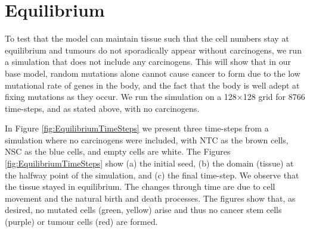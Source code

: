 \documentclass[\main/thesis.tex]{subfiles}
\begin{document}
\section{Equilibrium}
To test that the model can maintain tissue such that the cell numbers stay at equilibrium and tumours do not sporadically appear without carcinogens, we run a simulation that does not include any carcinogens. This will show that in our base model, random mutations alone cannot cause cancer to form due to the low mutational rate of genes in the body, and the fact that the body is well adept at fixing mutations as they occur. We run the simulation on a 128${\times}$128 grid for 8766 time-steps, and as stated above, with no carcinogens. 

In Figure \ref{fig:EquilibriumTimeSteps} we present three time-steps from a simulation where no carcinogens were included, with NTC as the brown cells, NSC as the blue cells, and empty cells are white. The Figures \ref{fig:EquilibriumTimeSteps} show (a) the initial seed, (b) the domain (tissue) at the halfway point of the simulation, and (c) the final time-step. 
We observe that the tissue stayed in equilibrium. The changes through time are due to cell movement and the natural birth and death processes. The figures show that, as desired, no mutated cells (green, yellow) arise and thus no cancer stem cells (purple) or tumour cells (red) are formed. 
\end{document}
